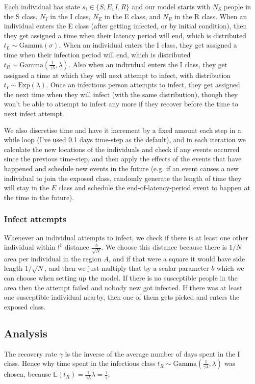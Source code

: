 \documentclass[11pt]{article}
\begin{document}
Each individual has state $s_i\in \{S,E,I,R\}$ and our model starts with $N_S$ people in the S class, $N_I$ in the I class, $N_E$ in the E class, and $N_R$ in the R class. When an individual enters the E class (after getting infected, or by initial condition), then they get assigned a time when their latency period will end, which is distributed $t_L \sim \text{Gamma}(\sigma)$. When an individual enters the I class, they get assigned a time when their infection period will end, which is distributed $t_R \sim \text{Gamma}(\frac{1}{\gamma\lambda}, \lambda)$. Also when an individual enters the I class, they get assigned a time at which they will next attempt to infect, with distribution $t_I\sim \text{Exp}(\lambda)$. Once an infectious person attempts to infect, they get assigned the next time when they will infect (with the same distribution), though they won't be able to attempt to infect any more if they recover before the time to next infect attempt.

We also discretise time and have it increment by a fixed amount each step in a while loop (I've used 0.1 days time-step as the default), and in each iteration we calculate the new locations of the individuals and check if any events occurred since the previous time-step, and then apply the effects of the events that have happened and schedule new events in the future (e.g. if an event causes a new individual to join the exposed class, randomly generate the length of time they will stay in the $E$ class and schedule the end-of-latency-period event to happen at the time in the future).
\subsubsection*{Infect attempts}
Whenever an individual attempts to infect, we check if there is at least one other individual within $l^1$ distance $\frac{b}{\sqrt{N}}$. We choose this distance because there is $1/N$ area per individual in the region $A$, and if that were a square it would have side length $1/\sqrt{N}$, and then we just multiply that by a scalar parameter $b$ which we can choose when setting up the model. If there is no susceptible people in the area then the attempt failed and nobody new got infected. If there was at least one susceptible individual nearby, then one of them gets picked and enters the exposed class.

\subsection*{Analysis}
The recovery rate $\gamma$ is the inverse of the average number of days spent in the I class. Hence why time spent in the infectious class $t_R \sim \text{Gamma}(\frac{1}{\gamma\lambda}, \lambda)$ was chosen, because $\mathbb{E}(t_R)=\frac{1}{\gamma\lambda} \lambda=\frac{1}{\gamma}$.
\end{document}
